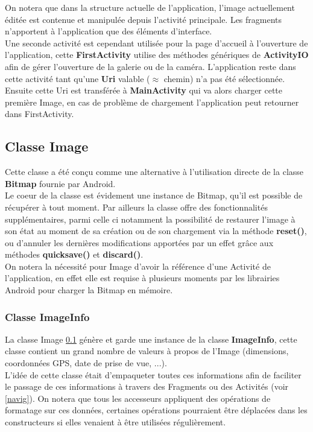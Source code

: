 On notera que dans la structure actuelle de l'application, l'image actuellement éditée est contenue et manipulée depuis l'activité principale. Les fragments n'apportent à l'application que des éléments d'interface.
\\

Une seconde activité est cependant utilisée pour la page d'accueil à l'ouverture de l'application, cette \textbf{FirstActivity} utilise des méthodes génériques de \textbf{ActivityIO} afin de gérer l'ouverture de la galerie ou de la caméra. L'application reste dans cette activité tant qu'une \textbf{Uri} valable ($\approx$ chemin) n'a pas été sélectionnée. Ensuite cette Uri est transférée à \textbf{MainActivity} qui va alors charger cette première Image, en cas de problème de chargement l'application peut retourner dans FirstActivity.

\subsection{Classe \textbf{Image}} \label{classeImage}
Cette classe a été conçu comme une alternative à l'utilisation directe de la classe \textbf{Bitmap} fournie par Android.
\\
Le coeur de la classe est évidement une instance de Bitmap, qu'il est possible de récupérer à tout moment. Par ailleurs la classe offre des fonctionnalités supplémentaires, parmi celle ci notamment la possibilité de restaurer l'image à son état au moment de sa création ou de son chargement via la méthode \textbf{reset()}, ou d'annuler les dernières modifications apportées par un effet grâce aux méthodes \textbf{quicksave()} et \textbf{discard()}.
\\

On notera la nécessité pour Image d'avoir la référence d'une Activité de l'application, en effet elle est requise à plusieurs moments par les librairies Android pour charger la Bitmap en mémoire.

\subsubsection{Classe \textbf{ImageInfo}}
La classe Image \ref{classeImage} génère et garde une instance de la classe \textbf{ImageInfo}, cette classe contient un grand nombre de valeurs à propos de l'Image (dimensions, coordonnées GPS, date de prise de vue, ...).
\\
L'idée de cette classe était d'empaqueter toutes ces informations afin de faciliter le passage de ces informations à travers des Fragments ou des Activités (voir \ref{navig}). On notera que tous les accesseurs appliquent des opérations de formatage sur ces données, certaines opérations pourraient être déplacées dans les constructeurs si elles venaient à être utilisées régulièrement.


